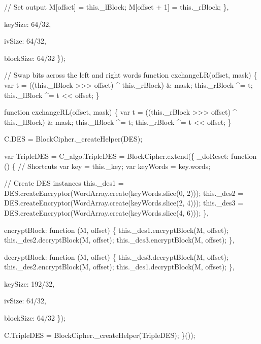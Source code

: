 \begin{DoxyCodeInclude}
            \textcolor{comment}{// Set output}
            M[offset] = this.\_lBlock;
            M[offset + 1] = this.\_rBlock;
        \},

        keySize: 64/32,

        ivSize: 64/32,

        blockSize: 64/32
    \});

    \textcolor{comment}{// Swap bits across the left and right words}
    \textcolor{keyword}{function} exchangeLR(offset, mask) \{
        var t = ((this.\_lBlock >>> offset) ^ this.\_rBlock) & mask;
        this.\_rBlock ^= t;
        this.\_lBlock ^= t << offset;
    \}

    \textcolor{keyword}{function} exchangeRL(offset, mask) \{
        var t = ((this.\_rBlock >>> offset) ^ this.\_lBlock) & mask;
        this.\_lBlock ^= t;
        this.\_rBlock ^= t << offset;
    \}

    C.DES = BlockCipher.\_createHelper(DES);

    var TripleDES = C\_algo.TripleDES = BlockCipher.extend(\{
        \_doReset: \textcolor{keyword}{function} () \{
            \textcolor{comment}{// Shortcuts}
            var key = this.\_key;
            var keyWords = key.words;

            \textcolor{comment}{// Create DES instances}
            this.\_des1 = DES.createEncryptor(WordArray.create(keyWords.slice(0, 2)));
            this.\_des2 = DES.createEncryptor(WordArray.create(keyWords.slice(2, 4)));
            this.\_des3 = DES.createEncryptor(WordArray.create(keyWords.slice(4, 6)));
        \},

        encryptBlock: \textcolor{keyword}{function} (M, offset) \{
            this.\_des1.encryptBlock(M, offset);
            this.\_des2.decryptBlock(M, offset);
            this.\_des3.encryptBlock(M, offset);
        \},

        decryptBlock: \textcolor{keyword}{function} (M, offset) \{
            this.\_des3.decryptBlock(M, offset);
            this.\_des2.encryptBlock(M, offset);
            this.\_des1.decryptBlock(M, offset);
        \},

        keySize: 192/32,

        ivSize: 64/32,

        blockSize: 64/32
    \});

    C.TripleDES = BlockCipher.\_createHelper(TripleDES);
\}());
\end{DoxyCodeInclude}
 